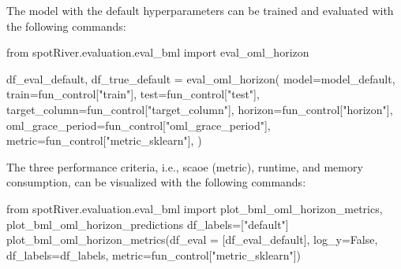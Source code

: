 \documentclass[
  letterpaper,
  DIV=11,
  numbers=noendperiod]{scrreprt}
\newenvironment{Shaded}{\begin{snugshade}}{\end{snugshade}}
\newcommand{\ImportTok}[1]{\textcolor[rgb]{0.00,0.46,0.62}{#1}}
\newcommand{\NormalTok}[1]{\textcolor[rgb]{0.00,0.23,0.31}{#1}}
\newcommand{\OperatorTok}[1]{\textcolor[rgb]{0.37,0.37,0.37}{#1}}
\newcommand{\StringTok}[1]{\textcolor[rgb]{0.13,0.47,0.30}{#1}}
\newcommand{\VariableTok}[1]{\textcolor[rgb]{0.07,0.07,0.07}{#1}}
\begin{document}
The model with the default hyperparameters can be trained and evaluated
with the following commands:

\begin{Shaded}
\begin{Highlighting}[]
\ImportTok{from}\NormalTok{ spotRiver.evaluation.eval\_bml }\ImportTok{import}\NormalTok{ eval\_oml\_horizon}

\NormalTok{df\_eval\_default, df\_true\_default }\OperatorTok{=}\NormalTok{ eval\_oml\_horizon(}
\NormalTok{                    model}\OperatorTok{=}\NormalTok{model\_default,}
\NormalTok{                    train}\OperatorTok{=}\NormalTok{fun\_control[}\StringTok{"train"}\NormalTok{],}
\NormalTok{                    test}\OperatorTok{=}\NormalTok{fun\_control[}\StringTok{"test"}\NormalTok{],}
\NormalTok{                    target\_column}\OperatorTok{=}\NormalTok{fun\_control[}\StringTok{"target\_column"}\NormalTok{],}
\NormalTok{                    horizon}\OperatorTok{=}\NormalTok{fun\_control[}\StringTok{"horizon"}\NormalTok{],}
\NormalTok{                    oml\_grace\_period}\OperatorTok{=}\NormalTok{fun\_control[}\StringTok{"oml\_grace\_period"}\NormalTok{],}
\NormalTok{                    metric}\OperatorTok{=}\NormalTok{fun\_control[}\StringTok{"metric\_sklearn"}\NormalTok{],}
\NormalTok{                )}
\end{Highlighting}
\end{Shaded}

The three performance criteria, i.e., scaoe (metric), runtime, and
memory consumption, can be visualized with the following commands:

\begin{Shaded}
\begin{Highlighting}[]
\ImportTok{from}\NormalTok{ spotRiver.evaluation.eval\_bml }\ImportTok{import}\NormalTok{ plot\_bml\_oml\_horizon\_metrics, plot\_bml\_oml\_horizon\_predictions}
\NormalTok{df\_labels}\OperatorTok{=}\NormalTok{[}\StringTok{"default"}\NormalTok{]}
\NormalTok{plot\_bml\_oml\_horizon\_metrics(df\_eval }\OperatorTok{=}\NormalTok{ [df\_eval\_default], log\_y}\OperatorTok{=}\VariableTok{False}\NormalTok{, df\_labels}\OperatorTok{=}\NormalTok{df\_labels, metric}\OperatorTok{=}\NormalTok{fun\_control[}\StringTok{"metric\_sklearn"}\NormalTok{])}
\end{Highlighting}
\end{Shaded}
\end{document}
